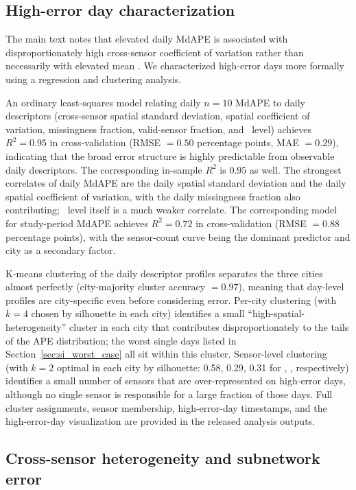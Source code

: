 \subsection{High-error day characterization}\label{sec:si_high_error_days}

The main text notes that elevated daily MdAPE is associated with disproportionately high cross-sensor coefficient of variation rather than necessarily with elevated mean \pmtt. We characterized high-error days more formally using a regression and clustering analysis.

An ordinary least-squares model relating daily $n=10$ MdAPE to daily descriptors (cross-sensor spatial standard deviation, spatial coefficient of variation, missingness fraction, valid-sensor fraction, and \pmtt\ level) achieves $R^2 = 0.95$ in cross-validation (RMSE $= 0.50$ percentage points, MAE $= 0.29$), indicating that the broad error structure is highly predictable from observable daily descriptors. The corresponding in-sample $R^2$ is $0.95$ as well. The strongest correlates of daily MdAPE are the daily spatial standard deviation and the daily spatial coefficient of variation, with the daily missingness fraction also contributing; \pmtt\ level itself is a much weaker correlate. The corresponding model for study-period MdAPE achieves $R^2 = 0.72$ in cross-validation (RMSE $= 0.88$ percentage points), with the sensor-count curve being the dominant predictor and city as a secondary factor.

K-means clustering of the daily descriptor profiles separates the three cities almost perfectly (city-majority cluster accuracy $= 0.97$), meaning that day-level profiles are city-specific even before considering error. Per-city clustering (with $k=4$ chosen by silhouette in each city) identifies a small ``high-spatial-heterogeneity'' cluster in each city that contributes disproportionately to the tails of the APE distribution; the worst single days listed in Section~\ref{sec:si_worst_case} all sit within this cluster. Sensor-level clustering (with $k=2$ optimal in each city by silhouette: 0.58, 0.29, 0.31 for , ,  respectively) identifies a small number of sensors that are over-represented on high-error days, although no single sensor is responsible for a large fraction of those days. Full cluster assignments, sensor membership, high-error-day timestamps, and the high-error-day visualization are provided in the released analysis outputs.

\subsection{Cross-sensor heterogeneity and subnetwork error}\label{sec:si_cv_slope}

